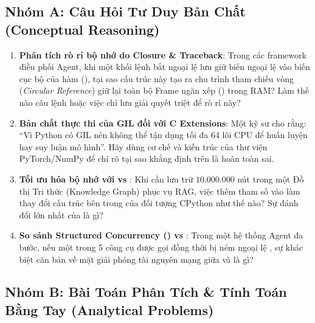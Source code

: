 \subsection{Nhóm A: Câu Hỏi Tư Duy Bản Chất (Conceptual Reasoning)}

\begin{enumerate}[label=\textbf{A\arabic*.}]
  \item \textbf{Phân tích rò rỉ bộ nhớ do Closure \& Traceback}: Trong các framework điều phối Agent, khi một khối lệnh bắt ngoại lệ lưu giữ biến ngoại lệ vào biến cục bộ của hàm (), tại sao cấu trúc này tạo ra chu trình tham chiếu vòng (\textit{Circular Reference}) giữ lại toàn bộ Frame ngăn xếp () trong RAM? Làm thế nào câu lệnh  hoặc việc chỉ lưu  giải quyết triệt để rò rỉ này?
  \item \textbf{Bản chất thực thi của GIL đối với C Extensions}: Một kỹ sư cho rằng: ``Vì Python có GIL nên không thể tận dụng tối đa 64 lõi CPU để huấn luyện hay suy luận mô hình''. Hãy dùng cơ chế  và kiến trúc của thư viện PyTorch/NumPy để chỉ rõ tại sao khẳng định trên là hoàn toàn sai.
  \item \textbf{Tối ưu hóa bộ nhớ với  vs }: Khi cần lưu trữ $10.000.000$ nút trong một Đồ thị Tri thức (Knowledge Graph) phục vụ RAG, việc thêm tham số  vào  làm thay đổi cấu trúc bên trong của đối tượng CPython như thế nào? Sự đánh đổi lớn nhất của  là gì?
  \item \textbf{So sánh Structured Concurrency () vs }: Trong một hệ thống Agent đa bước, nếu một trong 5 công cụ được gọi đồng thời bị ném ngoại lệ , sự khác biệt căn bản về mặt giải phóng tài nguyên mạng giữa  và  là gì?
\end{enumerate}

\subsection{Nhóm B: Bài Toán Phân Tích \& Tính Toán Bằng Tay (Analytical Problems)}


